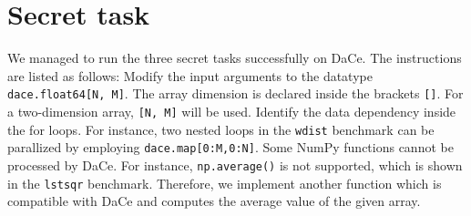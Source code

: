 \section{Secret task}

We managed to run the three secret tasks successfully on DaCe. The instructions are listed as follows:
 Modify the input arguments to the datatype  \texttt{dace.float64[N, M]}. The array dimension is declared inside the brackets \texttt{[]}. For a two-dimension array, \texttt{[N, M]} will be used.
 Identify the data dependency inside the for loops. For instance, two nested loops in the \texttt{wdist} benchmark can be parallized by employing \texttt{dace.map[0:M,0:N]}.
 Some NumPy functions cannot be processed by DaCe. For instance, \texttt{np.average()} is not supported, which is shown in the \texttt{lstsqr} benchmark. Therefore, we implement another function which is compatible with DaCe and computes the average value of the given array.